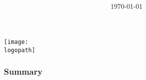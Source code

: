 \documentclass{beamer}
\title[\meetingname]{{\bf \titlename}}
\author{\authorname}
\institute[\institutionshort]{\institutionname}
\date[\mydate]{\meetingname\\\today}
\def\logopath{logos/tsp.png}
\def\companylogo{\texttt{[image: \\logopath]}}
\begin{document}
\begin{frame}[plain,t]
\titlepage
	\begin{center}
	
	\companylogo
	\end{center}
\end{frame}


\begin{frame}
	\frametitle{Summary}
	\tableofcontents
\end{frame}
\end{document}
